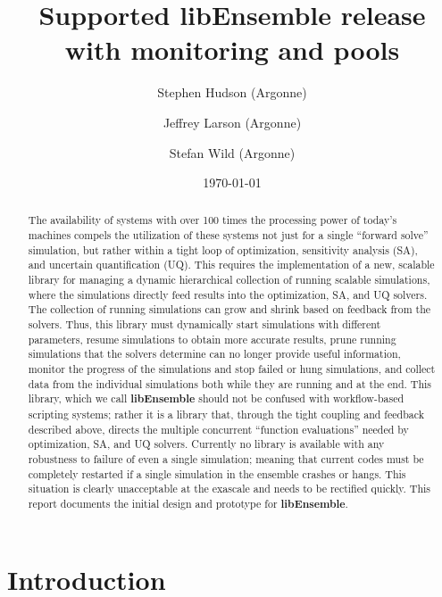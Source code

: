 \documentclass{ecpreport}
\title{Supported libEnsemble release with monitoring and pools}
\author{Stephen Hudson (Argonne)
\and Jeffrey Larson (Argonne)
  \and  Stefan Wild (Argonne)
}
\date{\today}
\begin{document}
\frontmatter


\begin{abstract}
The availability of systems with over 100 times the processing power of today’s 
machines compels the utilization of these systems not just for a single ``forward
solve'' simulation, but rather within a tight loop of optimization, sensitivity 
analysis (SA), and uncertain quantification (UQ). This requires the implementation 
of a new, scalable library for managing a dynamic hierarchical collection of 
running scalable simulations, where the simulations directly feed results 
into the optimization, SA, and UQ solvers.  The collection of running simulations 
can grow and shrink based on feedback from the solvers. Thus, this library must 
dynamically start simulations with different parameters, resume simulations to 
obtain more accurate results, prune running simulations that the solvers determine 
can no longer provide useful information, monitor the progress of the simulations 
and stop failed or hung simulations, and collect data from the individual 
simulations both while they are running and at the end.  This library, which 
we call {\bf libEnsemble} should not be confused with workflow-based scripting 
systems; rather it is a library that, through the tight coupling and feedback 
described above, directs the multiple concurrent ``function evaluations'' 
needed by optimization, SA, and UQ solvers. Currently no library is available 
with any robustness to failure of even a single simulation; meaning that current 
codes must be completely restarted if a single simulation in the ensemble 
crashes or hangs. This situation is clearly unacceptable at the exascale
and needs to be rectified quickly.  This report documents the initial
design and prototype for {\bf libEnsemble}.
\end{abstract}


\mainmatter
\section{Introduction}
\end{document}
